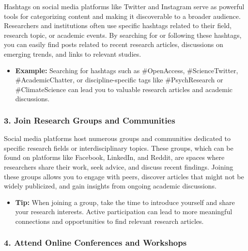 \documentclass[
]{book}
\providecommand{\tightlist}{%
  \setlength{\itemsep}{0pt}\setlength{\parskip}{0pt}}
\begin{document}
Hashtags on social media platforms like Twitter and Instagram serve as powerful tools for categorizing content and making it discoverable to a broader audience. Researchers and institutions often use specific hashtags related to their field, research topic, or academic events. By searching for or following these hashtags, you can easily find posts related to recent research articles, discussions on emerging trends, and links to relevant studies.

\begin{itemize}
\tightlist
\item
  \textbf{Example:} Searching for hashtags such as \#OpenAccess, \#ScienceTwitter, \#AcademicChatter, or discipline-specific tags like \#PsychResearch or \#ClimateScience can lead you to valuable research articles and academic discussions.
\end{itemize}

\subsubsection*{3. Join Research Groups and Communities}\label{join-research-groups-and-communities}

Social media platforms host numerous groups and communities dedicated to specific research fields or interdisciplinary topics. These groups, which can be found on platforms like Facebook, LinkedIn, and Reddit, are spaces where researchers share their work, seek advice, and discuss recent findings. Joining these groups allows you to engage with peers, discover articles that might not be widely publicized, and gain insights from ongoing academic discussions.

\begin{itemize}
\tightlist
\item
  \textbf{Tip:} When joining a group, take the time to introduce yourself and share your research interests. Active participation can lead to more meaningful connections and opportunities to find relevant research articles.
\end{itemize}

\subsubsection*{4. Attend Online Conferences and Workshops}\label{attend-online-conferences-and-workshops}
\end{document}
